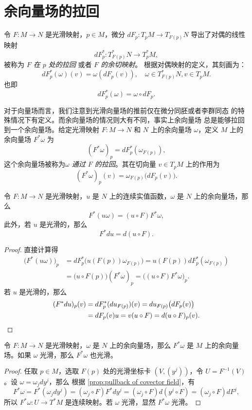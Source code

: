 \section{余向量场的拉回}

令 $F:M\to N$ 是光滑映射，$p\in M$，微分 $dF_p:T_pM\to T_{F(p)}N$
导出了对偶的线性映射
\[
  dF_p^*:T_{F(p)}^*N\to T_p^*M,  
\]
被称为 \emph{$F$ 在 $p$ 处的拉回} 或者 \emph{$F$ 的余切映射}。
根据对偶映射的定义，其刻画为：
\[
  dF_p^*(\omega)(v)= \omega(dF_p(v)),\quad \omega\in T_{F(p)}^*N,
  v\in T_pM.
\]
也即
\[
  dF_p^*(\omega)=\omega\circ dF_p.  
\]

对于向量场而言，我们注意到光滑向量场的推前仅在微分同胚或者李群同态
的特殊情况下有定义。而余向量场的情况则大有不同，事实上余向量场
总是能够拉回到一个余向量场。给定光滑映射 $F:M\to N$ 和
$N$ 上的余向量场 $\omega$，定义 $M$ 上的余向量场 $F^*\omega$
为
\[
  (F^*\omega)_p =dF_p^*(\omega_{F(p)}),
\]
这个余向量场被称为\emph{$\omega$ 通过 $F$ 的拉回}。其在切向量 $v\in T_pM$
上的作用为
\[
  (F^*\omega)_p(v)=\omega_{F(p)}\bigl(dF_p(v)\bigr)  .
\]

\begin{proposition}\label{prop:pullback of covector field}
  令 $F:M\to N$ 是光滑映射，$u$ 是 $N$ 上的连续实值函数，$\omega$ 是
  $N$ 上的余向量场，那么
  \[
    F^*(u\omega)=(u\circ F)F^*\omega,  
  \]
  此外，若 $u$ 是光滑的，那么
  \[
    F^*du=d(u\circ F).  
  \]
\end{proposition}
\begin{proof}
  直接计算得
  \begin{align*}
    \bigl(F^*(u\omega)\bigr)_p&=dF_p^*\bigl(u(F(p))\omega_{F(p)}\bigr)
    =u(F(p))dF_p^*(\omega_{F(p)})\\
    &=\bigl(u\circ F(p)\bigr) (F^*\omega)_p=\bigl((u\circ F)F^*\omega\bigr)_p.
  \end{align*}
  若 $u$ 是光滑的，那么
  \begin{align*}
    (F^*du)_p(v)&=dF_p^*(du_{F(p)})(v)=du_{F(p)}\bigl(dF_p(v)\bigr)\\
    &=dF_p(v)u=v(u\circ F)=d(u\circ F)_p(v).\qedhere
  \end{align*}
\end{proof}

\begin{proposition}
  令 $F:M\to N$ 是光滑映射，$\omega$ 是
  $N$ 上的余向量场，那么 $F^*\omega$ 是 $M$ 上的余向量场。如果
  $\omega$ 光滑，那么 $F^*\omega$ 也光滑。
\end{proposition}
\begin{proof}
  任取 $p\in M$，选取 $F(p)$ 处的光滑坐标卡 $(V,(y^j))$，令
  $U=F^{-1}(V)$。设 $\omega=\omega_jdy^j$，那么
  根据 \autoref{prop:pullback of covector field}，有
  \[
    F^*\omega=F^*\left(\omega_jdy^j\right)=
    (\omega_j\circ F)F^*dy^j=
    (\omega_j\circ F)d(y^j\circ F)=(\omega_j\circ F)dF^j,  
  \]
  所以 $F^*\omega:U\to T^*M$ 是连续映射。若 $\omega$ 光滑，显然
  $F^*\omega$ 光滑。
\end{proof}

